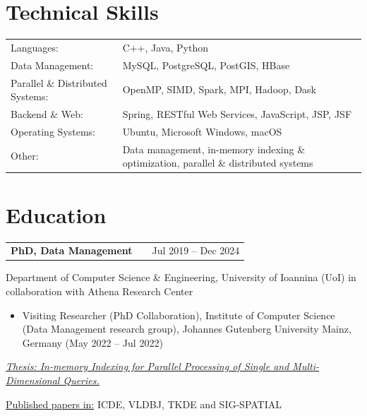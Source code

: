 \documentclass[a4paper,10pt]{article}
\makeatletter
\newenvironment{job}[2]
{
	\begin{tabularx}{\linewidth}{@{}l X r@{}}
		\small
		\textbf{#1} & \hfill &  #2 \\[3.75pt]
	\end{tabularx}
	\footnotesize
	\setlength{\parskip}{3pt} %
	\setlength{\parindent}{0pt} %
}
{
}
\makeatother
\begin{document}
		




\newpage

\section{Technical Skills}
\begin{tabularx}{\linewidth}{@{}l X@{}}
	Languages: &  \normalsize{C++, Java, Python
	}\\
	Data Management:  &  \normalsize{MySQL, PostgreSQL, PostGIS, HBase}\\ 
	Parallel \& Distributed Systems: &  \normalsize{OpenMP, SIMD, Spark, MPI, Hadoop, Dask}\\
	Backend \& Web: &  \normalsize{Spring, RESTful Web Services, JavaScript, JSP, JSF
	}\\
	Operating Systems: &  \normalsize{Ubuntu, Microsoft Windows, macOS
	}\\
	Other: &  \normalsize{Data management, in-memory indexing \& optimization, parallel \& distributed systems
	}\\   
\end{tabularx}


\section{Education}


\begin{job}{PhD, Data Management}{Jul 2019 – Dec 2024}
	Department of Computer Science \& Engineering, University of Ioannina (UoI) in collaboration with Athena Research Center
	
	\begin{itemize}
		\item Visiting Researcher (PhD Collaboration), Institute of Computer Science (Data Management research group), Johannes Gutenberg University Mainz, Germany (May 2022 – Jul 2022)
		
	\end{itemize}
	\vspace{-1\baselineskip}
	\underline{\textit{Thesis: In-memory Indexing for Parallel Processing of Single and Multi-Dimensional Queries.}}
	
	\underline{	Published papers in:} ICDE, VLDBJ, TKDE and SIG-SPATIAL
\end{job}
\end{document}
